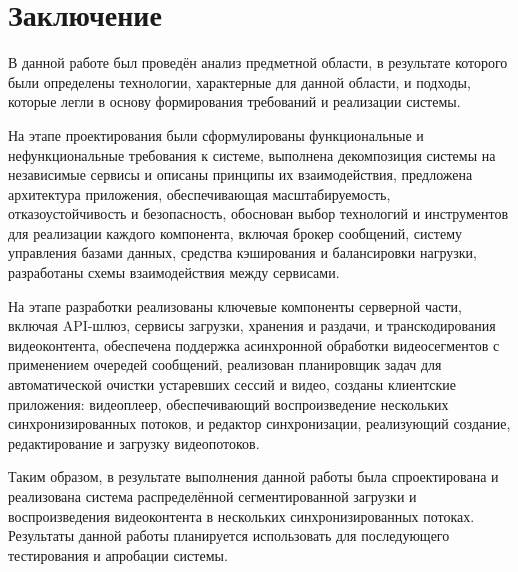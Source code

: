 \chapter*{Заключение} \label{ch-conclusion}

	В данной работе был проведён анализ предметной области, в результате которого были определены технологии, характерные для данной области, и подходы, которые легли в основу формирования требований и реализации системы.

	На этапе проектирования были сформулированы функциональные и нефункциональные требования к системе, выполнена декомпозиция системы на независимые сервисы и описаны принципы их взаимодействия, предложена архитектура приложения, обеспечивающая масштабируемость, отказоустойчивость и безопасность, обоснован выбор технологий и инструментов для реализации каждого компонента, включая брокер сообщений, систему управления базами данных, средства кэширования и балансировки нагрузки, разработаны схемы взаимодействия между сервисами.

	На этапе разработки реализованы ключевые компоненты серверной части, включая API-шлюз, сервисы загрузки, хранения и раздачи, и транскодирования видеоконтента, обеспечена поддержка асинхронной обработки видеосегментов с применением очередей сообщений, реализован планировщик задач для автоматической очистки устаревших сессий и видео, созданы клиентские приложения: видеоплеер, обеспечивающий воспроизведение нескольких синхронизированных потоков, и редактор синхронизации, реализующий создание, редактирование и загрузку видеопотоков.

	Таким образом, в результате выполнения данной работы была спроектирована и реализована система распределённой сегментированной загрузки и воспроизведения видеоконтента в нескольких синхронизированных потоках. Результаты данной работы планируется использовать для последующего тестирования и апробации системы.
